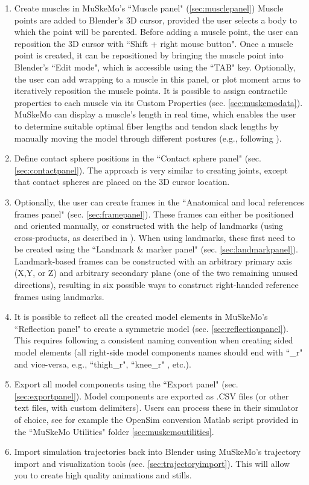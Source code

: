 \documentclass{article}
\begin{document}
\begin{enumerate}
\item	Create muscles in MuSkeMo's ``Muscle panel" (\ref{sec:musclepanel}) Muscle points are added to Blender's 3D cursor, provided the user selects a body to which the point will be parented. Before adding a muscle point, the user can reposition the 3D cursor with ``Shift + right mouse button". Once a muscle point is created, it can be repositioned by bringing the muscle point into Blender's ``Edit mode", which is accessible using the ``TAB" key. Optionally, the user can add wrapping to a muscle in this panel, or plot moment arms to iteratively reposition the muscle points. It is possible to assign contractile properties to each muscle via its Custom Properties (sec. \ref{sec:muskemodata}). MuSkeMo can display a muscle's length in real time, which enables the user to determine suitable optimal fiber lengths and tendon slack lengths by manually moving the model through different postures (e.g., following \cite{sellersMarchTitansLocomotor2013}).
\item	Define contact sphere positions in the ``Contact sphere panel" (sec. \ref{sec:contactpanel}). The approach is very similar to creating joints, except that contact spheres are placed on the 3D cursor location.
\item	Optionally, the user can create frames in the ``Anatomical and local references frames panel" (sec. \ref{sec:framepanel}). These frames can either be positioned and oriented manually, or constructed with the help of landmarks (using cross-products, as described in  \cite{wuISBRecommendationDefinitions2002,wuISBRecommendationDefinitions2005}). When using landmarks, these first need to be created using the ``Landmark \& marker panel" (sec. \ref{sec:landmarkpanel}). Landmark-based frames can be constructed with an arbitrary primary axis (X,Y, or Z) and arbitrary secondary plane (one of the two remaining unused directions), resulting in six possible ways to construct right-handed reference frames using landmarks.
\item	It is possible to reflect all the created model elements in MuSkeMo's ``Reflection panel" to create a symmetric model (sec. \ref{sec:reflectionpanel}). This requires following a consistent naming convention when creating sided model elements (all right-side model components names should end with ``\_r" and vice-versa, e.g., ``thigh\_r", ``knee\_r" , etc.).
\item Export all model components using the ``Export panel" (sec. \ref{sec:exportpanel}). Model components are exported as .CSV files (or other text files, with custom delimiters). Users can process these in their simulator of choice, see for example the OpenSim conversion Matlab script provided in the ``MuSkeMo Utilities" folder \ref{sec:muskemoutilities}.
\item Import simulation trajectories back into Blender using MuSkeMo's trajectory import and visualization tools (sec. \ref{sec:trajectoryimport}). This will allow you to create high quality animations and stills.
\end{enumerate}
\end{document}
